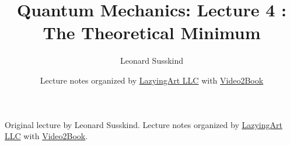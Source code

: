 \documentclass[11pt,oneside]{book}
\begin{document}
\frontmatter
\title{Quantum Mechanics: Lecture 4 : The Theoretical Minimum}
\author{Leonard Susskind}
\date{Lecture notes organized by \href{https://lazying.art}{LazyingArt LLC} with \href{https://github.com/lachlanchen/Video2Book}{Video2Book}}
\maketitle
\begin{center}
\small Original lecture by Leonard Susskind. Lecture notes organized by \href{https://lazying.art}{LazyingArt LLC} with \href{https://github.com/lachlanchen/Video2Book}{Video2Book}.
\end{center}
\clearpage
\mainmatter

\end{document}

